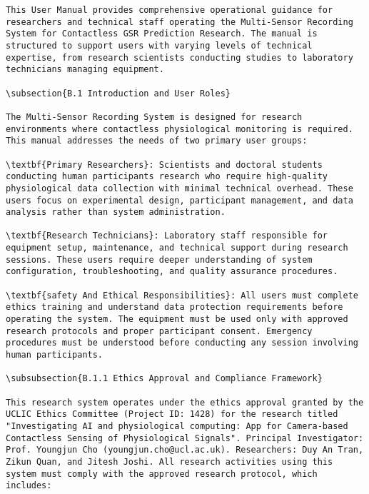 \begin{verbatim}
This User Manual provides comprehensive operational guidance for researchers and technical staff operating the Multi-Sensor Recording System for Contactless GSR Prediction Research. The manual is structured to support users with varying levels of technical expertise, from research scientists conducting studies to laboratory technicians managing equipment.

\subsection{B.1 Introduction and User Roles}

The Multi-Sensor Recording System is designed for research environments where contactless physiological monitoring is required. This manual addresses the needs of two primary user groups:

\textbf{Primary Researchers}: Scientists and doctoral students conducting human participants research who require high-quality physiological data collection with minimal technical overhead. These users focus on experimental design, participant management, and data analysis rather than system administration.

\textbf{Research Technicians}: Laboratory staff responsible for equipment setup, maintenance, and technical support during research sessions. These users require deeper understanding of system configuration, troubleshooting, and quality assurance procedures.

\textbf{safety And Ethical Responsibilities}: All users must complete ethics training and understand data protection requirements before operating the system. The equipment must be used only with approved research protocols and proper participant consent. Emergency procedures must be understood before conducting any session involving human participants.

\subsubsection{B.1.1 Ethics Approval and Compliance Framework}

This research system operates under the ethics approval granted by the UCLIC Ethics Committee (Project ID: 1428) for the research titled "Investigating AI and physiological computing: App for Camera-based Contactless Sensing of Physiological Signals". Principal Investigator: Prof. Youngjun Cho (youngjun.cho@ucl.ac.uk). Researchers: Duy An Tran, Zikun Quan, and Jitesh Joshi. All research activities using this system must comply with the approved research protocol, which includes:


\end{verbatim}
